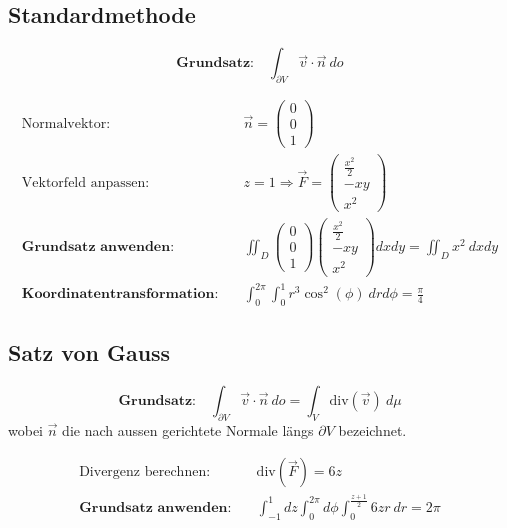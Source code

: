 \documentclass[11pt]{article}
\begin{document}
\subsection{Standardmethode}

\begin{equation*}
	\textbf{Grundsatz:}\quad\int_{\partial V} \vec{v}\cdot\vec{n}\ do
\end{equation*}

\begin{equation*}
\begin{split}
	\text{Normalvektor:}\quad & \vec{n} = \begin{pmatrix}
		0 \\ 0 \\ 1
	\end{pmatrix} \\
	\text{Vektorfeld anpassen:}\quad & z = 1 \Rightarrow \vec{F} = \begin{pmatrix}
		\frac{x^2}{2} \\ -xy \\ x^2
	\end{pmatrix} \\
	\textbf{Grundsatz anwenden:}\quad & \iint_D \begin{pmatrix}
		0 \\ 0 \\ 1
	\end{pmatrix}\begin{pmatrix}
		\frac{x^2}{2} \\ -xy \\ x^2
	\end{pmatrix} dxdy = \iint_D x^2\ dxdy \\
	\textbf{Koordinatentransformation:}\quad & \int_0^{2\pi} \int_0^1 r^3\cos^2(\phi)\ drd\phi = \frac{\pi}{4}
\end{split}
\end{equation*}

\subsection{Satz von Gauss}

\begin{equation*}
	\textbf{Grundsatz:}\quad\int_{\partial V} \vec{v}\cdot\vec{n}\ do = \int_V \text{div}(\vec{v})\ d\mu
\end{equation*}
wobei $\vec{n}$ die nach aussen gerichtete Normale l{\"a}ngs $\partial V$ bezeichnet.

\begin{equation*}
\begin{split}
	\text{Divergenz berechnen:}\quad & \text{div}(\vec{F}) = 6z \\
	\textbf{Grundsatz anwenden:}\quad & \int_{-1}^1 dz \int_0^{2\pi} d\phi \int_0^{\frac{z+1}{2}} 6zr\ dr = 2\pi
\end{split}
\end{equation*}
\end{document}
